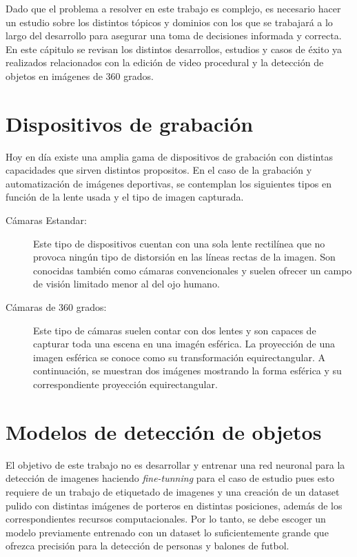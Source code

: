 Dado que el problema a resolver en este trabajo es complejo, es necesario hacer un estudio sobre los distintos tópicos y dominios con los que se trabajará a lo largo del desarrollo para asegurar una toma de decisiones informada y correcta. En este cápitulo se revisan los distintos desarrollos, estudios y casos de éxito ya realizados relacionados con la edición de video procedural y la detección de objetos en imágenes de 360 grados.

\section[Dispositivos de grabación]{Dispositivos de grabación}
Hoy en día existe una amplia gama de dispositivos de grabación con distintas capacidades que sirven distintos propositos. En el caso de la grabación y automatización de imágenes deportivas, se contemplan los siguientes tipos en función de la lente usada y el tipo de imagen capturada.
\begin{description}
	\item [Cámaras Estandar:] Este tipo de dispositivos cuentan con una sola lente rectilínea que no provoca ningún tipo de distorsión en las líneas rectas de la imagen. Son conocidas también como cámaras convencionales y suelen ofrecer un campo de visión limitado menor al del ojo humano.
	\item [Cámaras de 360 grados:] Este tipo de cámaras suelen contar con dos lentes y son capaces de capturar toda una escena en una imagén esférica. La proyección de una imagen esférica se conoce como su transformación equirectangular. A continuación, se muestran dos imágenes mostrando la forma esférica y su correspondiente proyección equirectangular.
\end{description}

\section[Detección de objetos]{Modelos de detección de objetos}
El objetivo de este trabajo no es desarrollar y entrenar una red neuronal para la detección de imagenes haciendo \textit{fine-tunning} para el caso de estudio pues esto requiere de un trabajo de etiquetado de imagenes y una creación de un dataset pulido con distintas imágenes de porteros en distintas posiciones, además de los correspondientes recursos computacionales. Por lo tanto, se debe escoger un modelo previamente entrenado con un dataset lo suficientemente grande que ofrezca precisión para la detección de personas y balones de futbol.

